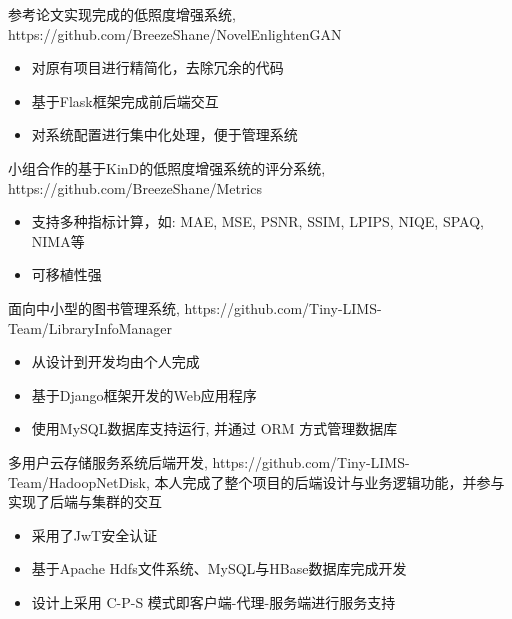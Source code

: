 \documentclass{resume}
\begin{document}
\begin{onehalfspacing}
参考论文实现完成的低照度增强系统, https://github.com/BreezeShane/NovelEnlightenGAN
\begin{itemize}
  \item 对原有项目进行精简化，去除冗余的代码
  \item 基于Flask框架完成前后端交互
  \item 对系统配置进行集中化处理，便于管理系统
\end{itemize}
\end{onehalfspacing}

\begin{onehalfspacing}
小组合作的基于KinD的低照度增强系统的评分系统, https://github.com/BreezeShane/Metrics
\begin{itemize}
  \item 支持多种指标计算，如: MAE, MSE, PSNR, SSIM, LPIPS, NIQE, SPAQ, NIMA等
  \item 可移植性强
\end{itemize}
\end{onehalfspacing}

\begin{onehalfspacing}
面向中小型的图书管理系统, https://github.com/Tiny-LIMS-Team/LibraryInfoManager
\begin{itemize}
  \item 从设计到开发均由个人完成
  \item 基于Django框架开发的Web应用程序
  \item 使用MySQL数据库支持运行, 并通过 ORM 方式管理数据库
\end{itemize}
\end{onehalfspacing}

\begin{onehalfspacing}
多用户云存储服务系统后端开发, https://github.com/Tiny-LIMS-Team/HadoopNetDisk, 本人完成了整个项目的后端设计与业务逻辑功能，并参与实现了后端与集群的交互
\begin{itemize}
  \item 采用了JwT安全认证
  \item 基于Apache Hdfs文件系统、MySQL与HBase数据库完成开发
  \item 设计上采用 C-P-S 模式即客户端-代理-服务端进行服务支持
\end{itemize}
\end{onehalfspacing}
\end{document}
